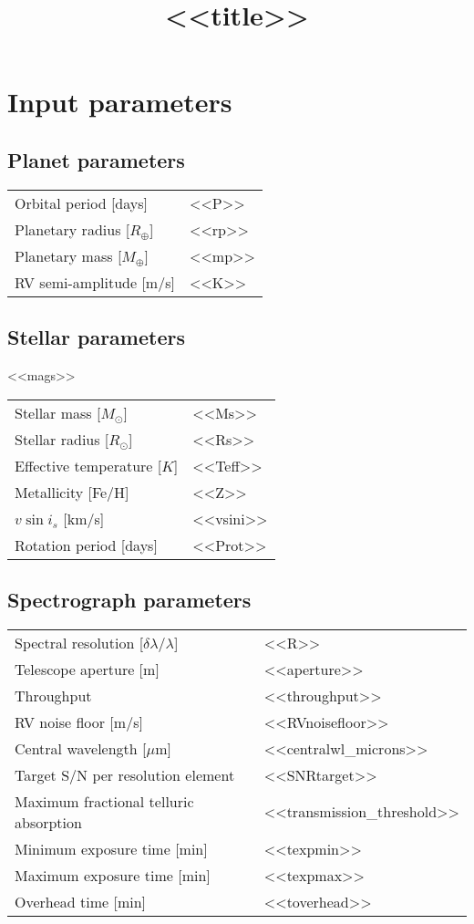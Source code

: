 \documentclass[a4paper]{article}
\title{\textbf{<<title>>}}
\begin{document}
\maketitle

\section{Input parameters}
\subsection{Planet parameters}
\begin{tabular}{ll}
  Orbital period [days] & <<P>> \\
  Planetary radius [$R_{\oplus}$] & <<rp>> \\
  Planetary mass [$M_{\oplus}$] & <<mp>> \\
  RV semi-amplitude [m/s] & <<K>>
\end{tabular}

\subsection{Stellar parameters}
<<mags>> \\

\noindent
\begin{tabular}{ll}
  Stellar mass [$M_{\odot}$] & <<Ms>> \\  
  Stellar radius [$R_{\odot}$] & <<Rs>> \\
  Effective temperature [$K$] & <<Teff>> \\
  Metallicity [Fe/H] & <<Z>> \\
  $v\sin{i_s}$ [km/s] & <<vsini>> \\
  Rotation period [days] & <<Prot>>
\end{tabular}

\subsection{Spectrograph parameters}
\begin{tabular}{ll}
  Spectral resolution [$\delta \lambda / \lambda$] & <<R>> \\
  Telescope aperture [m] & <<aperture>> \\
  Throughput & <<throughput>> \\
  RV noise floor [m/s] & <<RVnoisefloor>> \\
  Central wavelength [$\mu$m] & <<centralwl_microns>> \\ 
  Target S/N per resolution element & <<SNRtarget>> \\
  Maximum fractional telluric absorption & <<transmission_threshold>> \\
  Minimum exposure time [min] & <<texpmin>> \\
  Maximum exposure time [min] & <<texpmax>> \\
  Overhead time [min] & <<toverhead>> \\
\end{tabular}
\end{document}
